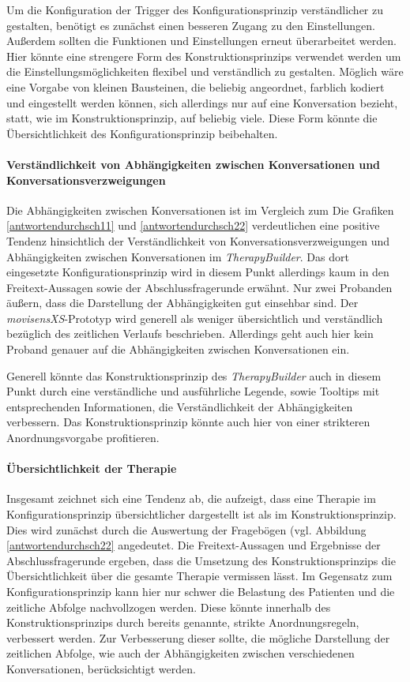Um die Konfiguration der Trigger des Konfigurationsprinzip verständlicher zu gestalten, benötigt es zunächst einen besseren Zugang zu den Einstellungen. Außerdem sollten die Funktionen und Einstellungen erneut überarbeitet werden. Hier könnte eine strengere Form des Konstruktionsprinzips verwendet werden um die Einstellungsmöglichkeiten flexibel und verständlich zu gestalten. Möglich wäre eine Vorgabe von kleinen Bausteinen, die beliebig angeordnet, farblich kodiert und eingestellt werden können, sich allerdings nur auf eine Konversation bezieht, statt, wie im Konstruktionsprinzip, auf beliebig viele. Diese Form könnte die Übersichtlichkeit des Konfigurationsprinzip beibehalten.


\paragraph{Verständlichkeit von Abhängigkeiten zwischen Konversationen und Konversationsverzweigungen}
Die Abhängigkeiten zwischen Konversationen ist im Vergleich zum 
Die Grafiken \ref{antwortendurchsch11} und \ref{antwortendurchsch22} verdeutlichen eine positive Tendenz hinsichtlich der Verständlichkeit von Konversationsverzweigungen und Abhängigkeiten zwischen Konversationen im \emph{TherapyBuilder}. Das dort eingesetzte Konfigurationsprinzip wird in diesem Punkt allerdings kaum in den Freitext-Aussagen sowie der Abschlussfragerunde erwähnt. Nur zwei Probanden äußern, dass die Darstellung der Abhängigkeiten gut einsehbar sind. Der \emph{movisensXS}-Prototyp wird generell als weniger übersichtlich und verständlich bezüglich des zeitlichen Verlaufs beschrieben. Allerdings geht auch hier kein Proband genauer auf die Abhängigkeiten zwischen Konversationen ein. 

Generell könnte das Konstruktionsprinzip des \emph{TherapyBuilder} auch in diesem Punkt durch eine verständliche und ausführliche Legende, sowie Tooltips mit entsprechenden Informationen, die Verständlichkeit der Abhängigkeiten verbessern. Das Konstruktionsprinzip könnte auch hier von einer strikteren Anordnungsvorgabe profitieren. 

\paragraph{Übersichtlichkeit der Therapie}
Insgesamt zeichnet sich eine Tendenz ab, die aufzeigt, dass eine Therapie im Konfigurationsprinzip übersichtlicher dargestellt ist als im Konstruktionsprinzip. Dies wird zunächst durch die Auswertung der Fragebögen (vgl. Abbildung \ref{antwortendurchsch22} angedeutet. Die Freitext-Aussagen und Ergebnisse der Abschlussfragerunde ergeben, dass die Umsetzung des Konstruktionsprinzips die Übersichtlichkeit über die gesamte Therapie vermissen lässt. Im Gegensatz zum Konfigurationsprinzip kann hier nur schwer die Belastung des Patienten und die zeitliche Abfolge nachvollzogen werden. Diese könnte innerhalb des Konstruktionsprinzips durch bereits genannte, strikte Anordnungsregeln, verbessert werden. Zur Verbesserung dieser sollte, die mögliche Darstellung der zeitlichen Abfolge, wie auch der Abhängigkeiten zwischen verschiedenen Konversationen, berücksichtigt werden.



